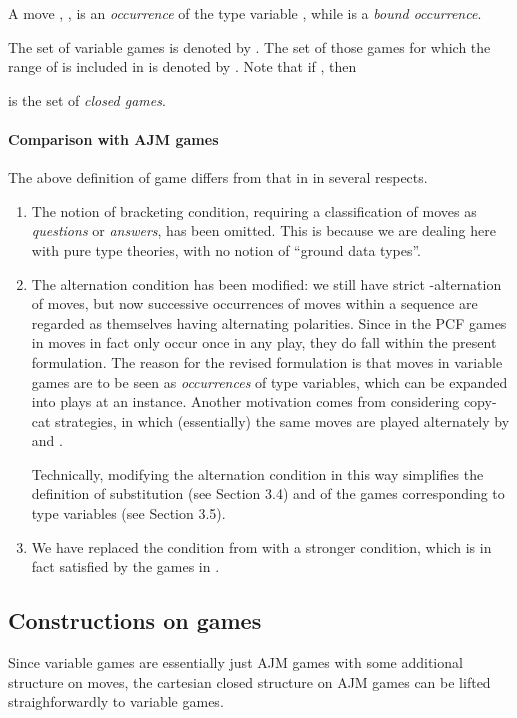 \documentclass[a4paper,11pt]{article}
\begin{document}
\noindent
A move , , is an \emph{occurrence} of the type
variable , while  is a \emph{bound occurrence}.

The set of variable games is denoted by . The set of
those games  for which the range of  is included in  is denoted by . Note that if , then

 is the set of \emph{closed games}.

\paragraph{Comparison with AJM games}
The above definition of game differs from that in \cite{AJM00} in
several respects.
\begin{enumerate}
\item The notion of bracketing condition, requiring a classification
  of moves as \emph{questions} or \emph{answers}, has been
  omitted. This is because we are dealing here with pure type
  theories, with no notion of ``ground data types''.
\item The alternation condition has been modified: we still have
  strict -alternation of moves, but now successive occurrences of
  moves within a sequence are regarded as themselves having
  alternating polarities. Since in the PCF games in \cite{AJM00} moves
  in fact only occur once in any play, they do fall within the present
  formulation. The reason for the revised formulation is that moves
  in variable games are to be seen as \emph{occurrences} of type variables,
  which can be expanded into plays at an instance. Another motivation
  comes from considering copy-cat strategies, in which (essentially)
  the same moves are
  played alternately by  and .

Technically, modifying the alternation condition in this way simplifies
the definition of substitution (see Section 3.4) and of the games
 corresponding to type variables (see Section 3.5).

\item We have replaced the condition  from \cite{AJM00}
  with a stronger condition, which is in fact satisfied by the games in
  \cite{AJM00}.
\end{enumerate}

\subsection{Constructions on games}
Since variable games are essentially just AJM games with some
additional structure on moves, the cartesian closed structure on AJM games
can be lifted straighforwardly to variable games.
\end{document}
